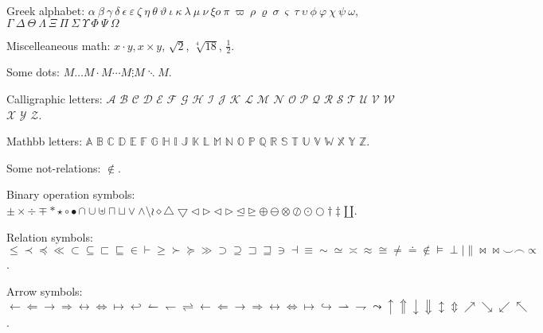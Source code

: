 \documentclass[12pt]{article}
\begin{document}
{Greek alphabet: $\alpha\ \beta\ \gamma\ \delta\ \epsilon\ 
    \varepsilon\ \zeta\ \eta\ \theta\ \vartheta\ \iota\ \kappa\ \lambda\
    \mu\ \nu\ \xi o\ \pi\ \varpi\ \rho\ \varrho\ \sigma\ \varsigma\ 
    \tau\ \upsilon\ \phi\ \varphi\ \chi\ \psi\ \omega$,  
    $\Gamma\ \Delta\ \Theta\ \Lambda\ \Xi\ \Pi\ \Sigma\ \Upsilon\ \Phi\ 
    \Psi\ \Omega$

Miscelleaneous math: $x \cdot y, x \times y$, $\sqrt{2}$, $\sqrt[4]{18}$,
    $\frac{1}{2}$.

Some dots: $M \ldots M \cdot M \cdots M \vdots M \ddots M$.

Calligraphic letters: $\mathcal{A}$ $\mathcal{B}$ $\mathcal{C}$ $\mathcal{D}$
 $\mathcal{E}$ $\mathcal{F}$ $\mathcal{G}$ $\mathcal{H}$ $\mathcal{I}$
 $\mathcal{J}$ $\mathcal{K}$ $\mathcal{L}$ $\mathcal{M}$ $\mathcal{N}$
 $\mathcal{O}$ $\mathcal{P}$ $\mathcal{Q}$ $\mathcal{R}$ $\mathcal{S}$
 $\mathcal{T}$ $\mathcal{U}$ $\mathcal{V}$ $\mathcal{W}$ $\mathcal{X}$
 $\mathcal{Y}$ $\mathcal{Z}$.

Mathbb letters: $\mathbb{A}$ $\mathbb{B}$ $\mathbb{C}$ $\mathbb{D}$
 $\mathbb{E}$ $\mathbb{F}$ $\mathbb{G}$ $\mathbb{H}$ $\mathbb{I}$
 $\mathbb{J}$ $\mathbb{K}$ $\mathbb{L}$ $\mathbb{M}$ $\mathbb{N}$
 $\mathbb{O}$ $\mathbb{P}$ $\mathbb{Q}$ $\mathbb{R}$ $\mathbb{S}$
 $\mathbb{T}$ $\mathbb{U}$ $\mathbb{V}$ $\mathbb{W}$ $\mathbb{X}$
 $\mathbb{Y}$ $\mathbb{Z}$.

Some not-relations: $ \not\in $.

Binary operation symbols: $ \pm \times \div \mp \ast \star \circ \bullet
 \cap \cup \uplus \sqcap \sqcup \vee \wedge \setminus \wr \diamond
 \bigtriangleup \bigtriangledown \triangleleft \triangleright \lhd
 \rhd \unlhd \unrhd \oplus \ominus \otimes \oslash \odot \bigcirc \dagger
 \ddagger \amalg$.

Relation symbols: $ \leq \prec \preceq \ll \subset \subseteq \sqsubset
 \sqsubseteq \in \vdash \geq \succ \succeq \gg \supset \supseteq \sqsupset
 \sqsupseteq \ni \dashv \equiv \sim \simeq \asymp \approx \cong \neq
 \doteq \notin \models \perp \mid \parallel \bowtie \Join \smile \frown
 \propto$.

Arrow symbols: $ \leftarrow \Leftarrow \rightarrow \Rightarrow \leftrightarrow
 \Leftrightarrow \mapsto \hookleftarrow \leftharpoonup \leftharpoondown
 \rightleftharpoons \longleftarrow \Longleftarrow \longrightarrow
 \Longrightarrow \longleftrightarrow \Longleftrightarrow \longmapsto
 \hookrightarrow \rightharpoonup \rightharpoondown \leadsto \uparrow \Uparrow
 \downarrow \Downarrow \updownarrow \Updownarrow \nearrow \searrow \swarrow
 \nwarrow$.

}
\end{document}
